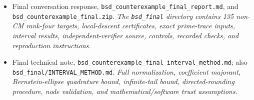 \documentclass[11pt]{article}
\begin{document}
\begin{itemize}
\item[A4]\hypertarget{source:A4}{}Final conversation response,
\nolinkurl{bsd_counterexample_final_report.md}, and
\nolinkurl{bsd_counterexample_final.zip}.
\textit{The \nolinkurl{bsd_final} directory contains 135 non-CM rank-four targets,
local-descent certificates, exact prime-trace inputs, interval results,
independent-verifier source, controls, recorded checks, and reproduction
instructions.}

\item[A5]\hypertarget{source:A5}{}Final technical note,
\nolinkurl{bsd_counterexample_final_interval_method.md}; also
\nolinkurl{bsd_final/INTERVAL_METHOD.md}.
\textit{Full normalization, coefficient majorant, Bernstein-ellipse quadrature
bound, infinite-tail bound, directed-rounding procedure, node validation,
and mathematical/software trust assumptions.}
\end{itemize}
\end{document}
